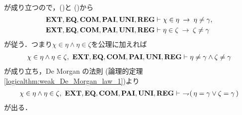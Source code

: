 \begin{sketch}
\begin{description}
\begin{align}
				\end{align}
				が成り立つので，()と
				()から
				\begin{align}
					\mbox{{\bf EXT}},\mbox{{\bf EQ}},\mbox{\bf COM},\mbox{{\bf PAI}},\mbox{{\bf UNI}},\mbox{{\bf REG}} &\vdash 
					\chi \in \eta \hspace{0.25em}\rightarrow\hspace{0.25em} \eta \neq \gamma, 
					\label{fom:no_three_sets_go_round_17} \\
					\mbox{{\bf EXT}},\mbox{{\bf EQ}},\mbox{\bf COM},\mbox{{\bf PAI}},\mbox{{\bf UNI}},\mbox{{\bf REG}} &\vdash 
					\eta \in \zeta \hspace{0.25em}\rightarrow\hspace{0.25em} \zeta \neq \gamma
					\label{fom:no_three_sets_go_round_18}
				\end{align}
				が従う．つまり$\chi \in \eta \wedge \eta \in \zeta$を公理に加えれば
				\begin{align}
					\chi \in \eta \wedge \eta \in \zeta,\ 
					\EXTAX,\EQAX,\COMAX,\PAIAX,\UNIAX,\REGAX \vdash \eta \neq \gamma \wedge \zeta \neq \gamma
				\end{align}
				が成り立ち，De Morgan の法則
				(論理的定理\ref{logicalthm:weak_De_Morgan_law_1})より
				\begin{align}
					\chi \in \eta \wedge \eta \in \zeta,\ 
					\EXTAX,\EQAX,\COMAX,\PAIAX,\UNIAX,\REGAX \vdash\ 
					\negation (\, \eta = \gamma \vee \zeta = \gamma\, )
					\label{fom:no_three_sets_go_round_19}
				\end{align}
				が出る．
				

\end{description}
\end{sketch}
